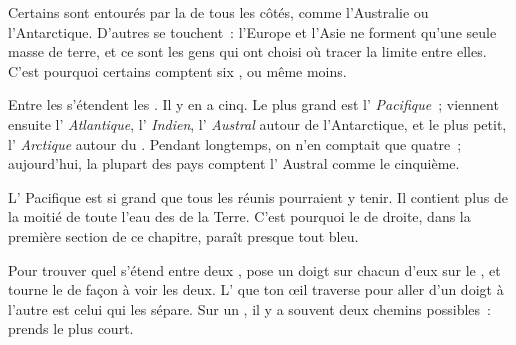 \begin{remark}\label{rem:g3:continents-and-oceans:where}
Certains  sont entourés par la  de tous les côtés, comme
l'Australie ou l'Antarctique. D'autres se touchent~: l'Europe et l'Asie ne
forment qu'une seule masse de terre, et ce sont les gens qui ont choisi
où tracer la limite entre elles. C'est pourquoi certains comptent six
, ou même moins.
\end{remark}

Entre les  s'étendent les . Il y en a cinq. Le plus grand
est l'\emph{ Pacifique}~; viennent ensuite l'\emph{ Atlantique},
l'\emph{ Indien}, l'\emph{ Austral} autour de l'Antarctique, et
le plus petit, l'\emph{ Arctique} autour du . Pendant
longtemps, on n'en comptait que quatre~; aujourd'hui, la plupart des pays
comptent l' Austral comme le cinquième.

\begin{example}\label{ex:g3:continents-and-oceans:pacific}
L' Pacifique est si grand que tous les  réunis pourraient
y tenir. Il contient plus de la moitié de toute l'eau des  de la
Terre. C'est pourquoi le  de droite, dans la première section de ce
chapitre, paraît presque tout bleu.
\end{example}

\begin{method}\label{met:g3:continents-and-oceans:between}
Pour trouver quel  s'étend entre deux , pose un doigt sur
chacun d'eux sur le , et tourne le  de façon à voir les deux.
L' que ton œil traverse pour aller d'un doigt à l'autre est celui qui
les sépare. Sur un , il y a souvent deux chemins possibles~: prends
le plus court.
\end{method}

